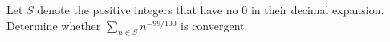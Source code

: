 Let $S$ denote the positive integers that have no 0 in their decimal expansion.
Determine whether $\displaystyle \sum_{n \in S} n^{-99/100}$ is convergent.
